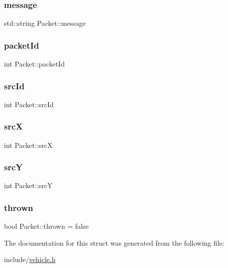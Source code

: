 \hypertarget{struct_packet_a0e7b672745479c3246c495020baefb37}{}\label{struct_packet_a0e7b672745479c3246c495020baefb37} 
\subsubsection{\texorpdfstring{message}{message}}
{\footnotesize\ttfamily std\+::string Packet\+::message}

\hypertarget{struct_packet_aae6c808e4b78bd0b7132d304eaaed11a}{}\label{struct_packet_aae6c808e4b78bd0b7132d304eaaed11a} 
\subsubsection{\texorpdfstring{packet\+Id}{packetId}}
{\footnotesize\ttfamily int Packet\+::packet\+Id}

\hypertarget{struct_packet_a49ad0fa6d01cef616890e7600738347f}{}\label{struct_packet_a49ad0fa6d01cef616890e7600738347f} 
\subsubsection{\texorpdfstring{src\+Id}{srcId}}
{\footnotesize\ttfamily int Packet\+::src\+Id}

\hypertarget{struct_packet_a4914e635f21d35be79e49f120a7c0a58}{}\label{struct_packet_a4914e635f21d35be79e49f120a7c0a58} 
\subsubsection{\texorpdfstring{srcX}{srcX}}
{\footnotesize\ttfamily int Packet\+::srcX}

\hypertarget{struct_packet_a602f69d786a518061ec0f10a062f238f}{}\label{struct_packet_a602f69d786a518061ec0f10a062f238f} 
\subsubsection{\texorpdfstring{srcY}{srcY}}
{\footnotesize\ttfamily int Packet\+::srcY}

\hypertarget{struct_packet_a038e9272912182b7489c2b972c360267}{}\label{struct_packet_a038e9272912182b7489c2b972c360267} 
\subsubsection{\texorpdfstring{thrown}{thrown}}
{\footnotesize\ttfamily bool Packet\+::thrown = false}



The documentation for this struct was generated from the following file\+:\begin{DoxyCompactItemize}
\item 
include/\hyperlink{vehicle_8h}{vehicle.\+h}\end{DoxyCompactItemize}

